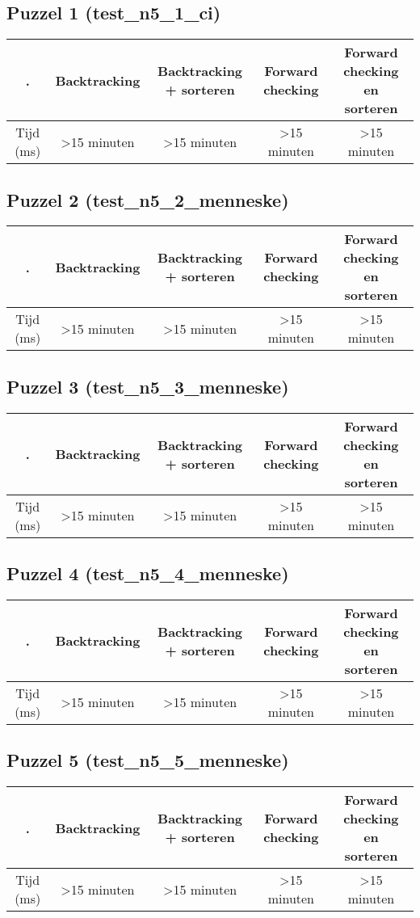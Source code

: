 \documentclass[]{report}
\begin{document}
\begin{appendices}
\subsection{Puzzel 1 (test\_n5\_1\_ci)}
\begin{tabular}{|c||c|c|c|c|}
\hline . & Backtracking & Backtracking + sorteren & Forward checking & Forward checking en sorteren \\ 
\hline \hline Tijd (ms) & >15 minuten & >15 minuten & >15 minuten & >15 minuten \\ 
\hline 
\end{tabular}
\subsection{Puzzel 2 (test\_n5\_2\_menneske)}
\begin{tabular}{|c||c|c|c|c|}
\hline . & Backtracking & Backtracking + sorteren & Forward checking & Forward checking en sorteren \\ 
\hline \hline Tijd (ms) & >15 minuten & >15 minuten & >15 minuten & >15 minuten \\ 
\hline 
\end{tabular}
\subsection{Puzzel 3 (test\_n5\_3\_menneske)}
\begin{tabular}{|c||c|c|c|c|}
\hline . & Backtracking & Backtracking + sorteren & Forward checking & Forward checking en sorteren \\ 
\hline \hline Tijd (ms) & >15 minuten & >15 minuten & >15 minuten & >15 minuten \\ 
\hline 
\end{tabular}
\subsection{Puzzel 4 (test\_n5\_4\_menneske)}
\begin{tabular}{|c||c|c|c|c|}
\hline . & Backtracking & Backtracking + sorteren & Forward checking & Forward checking en sorteren \\ 
\hline \hline Tijd (ms) & >15 minuten & >15 minuten & >15 minuten & >15 minuten \\ 
\hline 
\end{tabular}
\subsection{Puzzel 5 (test\_n5\_5\_menneske)}
\begin{tabular}{|c||c|c|c|c|}
\hline . & Backtracking & Backtracking + sorteren & Forward checking & Forward checking en sorteren \\ 
\hline \hline Tijd (ms) & >15 minuten & >15 minuten & >15 minuten & >15 minuten \\ 
\hline 
\end{tabular}

\end{appendices}
\end{document}
